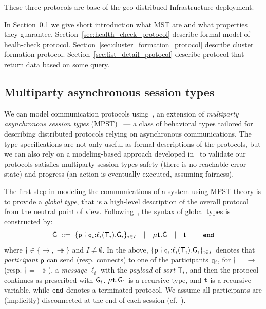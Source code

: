 These three protocols are base of the geo-distribued Infrastructure deployment.

In Section~\ref{sec:multiparty} we give short introduction what MST are and what properties they guarantee. Section~\ref{sec:health_check_protocol} describe formal model of healh-check protocol. Section~\ref{sec:cluster_formation_protocol} describe cluster formation protocol. Section~\ref{sec:list_detail_protocol} describe protocol that return data based on some query.
%
%
\subsection{Multiparty asynchronous session types}\label{sec:multiparty}
%
We can model communication protocols %
using~\cite{HuY17}, an extension of \emph{multiparty asynchronous session types} (MPST)~\cite{HondaYC08} %
--- a class of behavioral types tailored for describing distributed protocols relying on asynchronous
communications. 
The type specifications are not only useful as formal descriptions of the protocols, but we can also rely on a modeling-based approach developed in~\cite{HuY17} to validate our protocols satisfies multiparty session types safety (there is no reachable error state) and progress (an action is eventually executed, assuming
fairness). %

The first step in modeling the communications of a system using MPST theory 
is to provide a \emph{global type}, that is a high-level description of the overall protocol from the neutral 
point of view. 
Following~\cite{HuY17}, the syntax of global types is constructed by:\\ 
\[
{\sf G} \; ::= \;
\{{\sf p}\dagger{\sf q}_i{:}\ell_i({\mathsf T}_i).{\sf G}_i\}_{i\in I}  \quad | \quad 
\mu \textbf{t}.{\sf G} \quad | \quad 
\textbf{t} \quad | \quad
\mathtt{end}
\] 
where $\dagger\in\{\to, \twoheadrightarrow\}$ and $I\not=\emptyset$. 
In the above, $\{{\sf p}\dagger{\sf q}_i{:}\ell_i({\mathsf T}_i).{\sf G}_i\}_{i\in I}$
denotes that \emph{participant} ${\sf p}$ can send (resp. connects) to one of the participants ${\sf q}_i$, 
for $\dagger=\to$ (resp. $\dagger=\twoheadrightarrow$), 
a \emph{message} $\ell_i$ with the \emph{payload} of \emph{sort} ${\mathsf T}_i$, 
and then the protocol continues as prescribed with ${\sf G}_i$.  
$\mu \textbf{t}.{\sf G}_1$ is a recursive type, and $\textbf{t}$ is a recursive variable, 
while $\mathtt{end}$ denotes a terminated protocol. We assume all participants are (implicitly) disconnected at the end of each session (cf.~\cite{HuY17}). 

